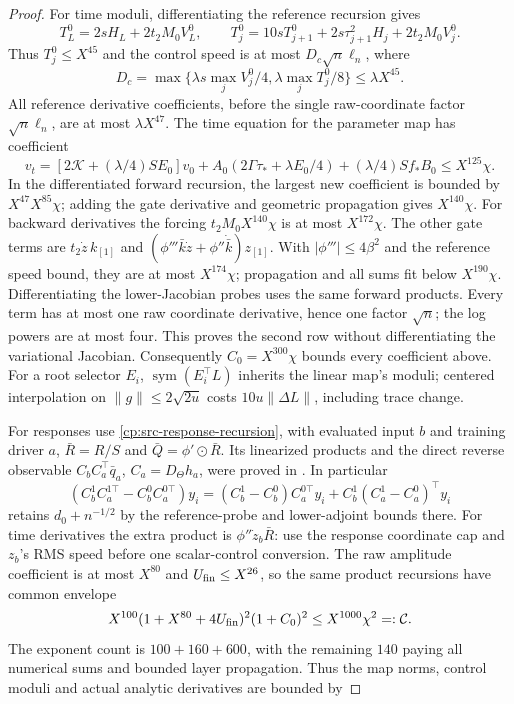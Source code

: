 \begin{proof}
For time moduli, differentiating the reference recursion gives
\[
T_L^0=2sH_L+2t_2M_0V_L^0,\qquad
T_j^0=10sT_{j+1}^0+2s\tau_{j+1}^2H_j+2t_2M_0V_j^0.
\]
Thus $T_j^0\le X^{45}$ and the control speed is at most
$D_c\sqrt n\ell_n$, where
\[
D_c=\max\{\lambda s\max_jV_j^0/4,\lambda\max_jT_j^0/8\}
\le\lambda X^{45}.
\]
All reference derivative coefficients, before the single raw-coordinate
factor $\sqrt n\ell_n$, are at most $\lambda X^{47}$.
The time equation for the parameter map has coefficient
\[
v_t=[2\mathcal K+(\lambda/4)SE_0]v_0
 +A_0(2\Gamma\tau_*+\lambda E_0/4)+(\lambda/4)Sf_*B_0
 \le X^{125}\chi.
\]
In the differentiated forward recursion, the largest new coefficient
is bounded by $X^{47}X^{85}\chi$; adding the gate derivative and
geometric propagation gives $X^{140}\chi$.
For backward derivatives the forcing
$t_2M_0X^{140}\chi$ is at most $X^{172}\chi$.
The other gate terms are $t_2\dot z\,k_{[1]}$ and
$(\phi'''\bar k\dot z+\phi''\dot{\bar k})z_{[1]}$.
With $|\phi'''|\le4\beta^2$ and the reference speed bound, they are
at most $X^{174}\chi$; propagation and all sums fit below
$X^{190}\chi$.
Differentiating the lower-Jacobian probes uses the same forward
products. Every term has at most one raw coordinate derivative,
hence one factor $\sqrt n$; the log powers are at most four.
This proves the second row without differentiating the variational Jacobian.
Consequently $C_0=X^{300}\chi$ bounds every coefficient above.
For a root selector $E_i$, $\operatorname{sym}(E_i^\top L)$
inherits the linear map's moduli; centered interpolation on
$\|g\|\le2\sqrt{2u}$ costs $10u\|\Delta L\|$, including trace change.

For responses use \eqref{cp:src-response-recursion}, with evaluated
input $b$ and training driver $a$, $\bar R=R/S$ and
$\bar Q=\phi'\odot\bar R$. Its linearized products and the direct
reverse observable $C_bC_a^\top\bar q_a$, $C_a=D_\Theta h_a$,
were proved in . In particular
\[
(C_b^1C_a^{1\top}-C_b^0C_a^{0\top})y_i
=(C_b^1-C_b^0)C_a^{0\top}y_i
 +C_b^1(C_a^1-C_a^0)^\top y_i
\]
retains $d_0+n^{-1/2}$ by the reference-probe and lower-adjoint bounds
there. For time derivatives the extra product is
$\phi''\dot z_b\bar R$: use the response coordinate cap and $z_b$'s
RMS speed before one scalar-control conversion. The raw amplitude
coefficient is at most $X^{80}$ and $U_{\rm fin}\le X^{26}$, so
the same product recursions have common envelope
\[
X^{100}(1+X^{80}+4U_{\rm fin})^2(1+C_0)^2
 \le X^{1000}\chi^2=:\mathcal C.
\]
The exponent count is $100+160+600$, with the remaining $140$ paying
all numerical sums and bounded layer propagation. Thus the map norms,
control moduli and actual analytic derivatives are bounded by


\end{proof}
